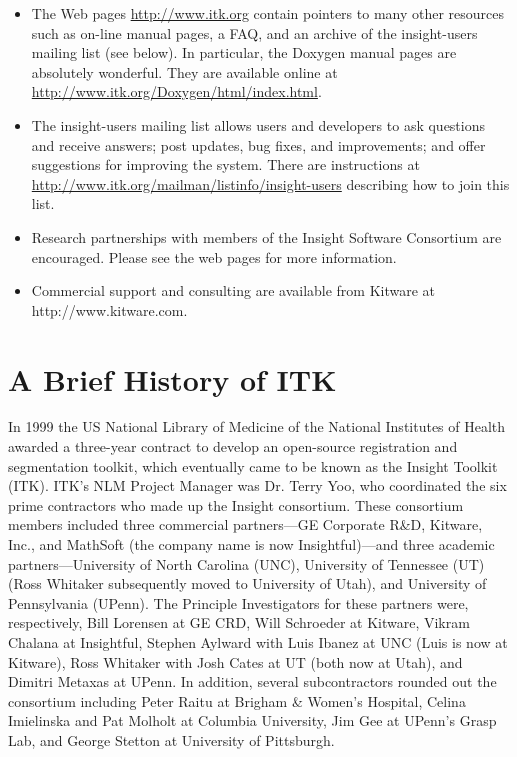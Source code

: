 \begin{itemize}
	\item The Web pages \url{http://www.itk.org} contain pointers to
	many other resources such as on-line manual pages, a FAQ, and an
	archive of the insight-users mailing list (see below). In particular,
	the Doxygen manual pages are absolutely wonderful. They are 
        available online at \url{http://www.itk.org/Doxygen/html/index.html}.

	\item The insight-users mailing list allows users and developers to ask
	questions and receive answers; post updates, bug fixes, and
	improvements; and offer suggestions for improving the system. There
	are instructions at 
        \url{http://www.itk.org/mailman/listinfo/insight-users}
	describing how to join this list.

        \item Research partnerships with members of the Insight Software
        Consortium are encouraged. Please see the web pages for more 
        information.

	\item Commercial support and consulting are available from Kitware at
	http://www.kitware.com. 
\end{itemize}

\section{A Brief History of ITK}
\label{sec:History}


In 1999 the US National Library of Medicine of the National Institutes of
Health awarded a three-year contract to develop an open-source registration
and segmentation toolkit, which eventually came to be known as the Insight
Toolkit (ITK). ITK's NLM Project Manager was Dr. Terry Yoo, who coordinated
the six prime contractors who made up the Insight consortium. These
consortium members included three commercial partners---GE Corporate R\&D,
Kitware, Inc., and MathSoft (the company name is now Insightful)---and three
academic partners---University of North Carolina (UNC), University of
Tennessee (UT) (Ross Whitaker subsequently moved to University of Utah), and
University of Pennsylvania (UPenn). The Principle Investigators for these
partners were, respectively, Bill Lorensen at GE CRD, Will Schroeder at
Kitware, Vikram Chalana at Insightful, Stephen Aylward with Luis Ibanez at
UNC (Luis is now at Kitware), Ross Whitaker with Josh Cates at UT (both now
at Utah), and Dimitri Metaxas at UPenn. In addition, several subcontractors
rounded out the consortium including Peter Raitu at Brigham \& Women's
Hospital, Celina Imielinska and Pat Molholt at Columbia University, Jim Gee
at UPenn's Grasp Lab, and George Stetton at University of Pittsburgh.

